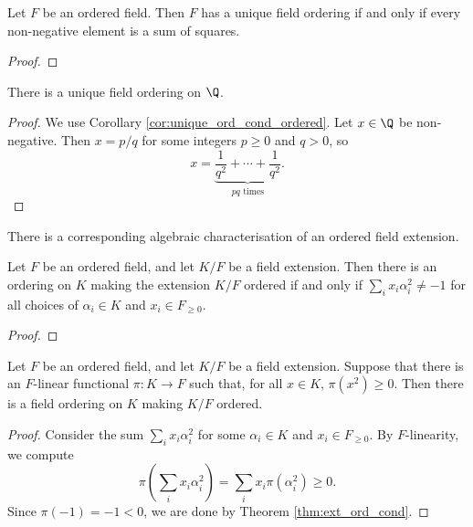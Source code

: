 \begin{corollary}
  \label{cor:unique_ord_cond_ordered}
  \leanok
  Let $F$ be an ordered field. Then $F$ has a unique field ordering if and only if every non-negative element is a sum of squares.
\end{corollary}
\begin{proof}
  \leanok
\end{proof}

\begin{corollary}
  \label{cor:unique_ord_Q}
  There is a unique field ordering on $\Q$.
\end{corollary}
\begin{proof}
  We use Corollary \ref{cor:unique_ord_cond_ordered}. Let $x\in\Q$ be non-negative. Then $x=p/q$ for some integers $p\geq0$ and $q>0$, so 
  \[x=\underbrace{\frac{1}{q^2}+\cdots+\frac{1}{q^2}}_{pq\text{ times}}.\]
\end{proof}

There is a corresponding algebraic characterisation of an ordered field extension.

\begin{theorem}
  \label{thm:ext_ord_cond}
  \leanok
  Let $F$ be an ordered field, and let $K/F$ be a field extension. Then there is an ordering on $K$ making the extension $K/F$ ordered if and only if $\sum_i x_i\alpha_i^2\neq-1$ for all choices of $\alpha_i\in K$ and $x_i\in F_{\geq0}$.
\end{theorem}
\begin{proof}
  \leanok
\end{proof}

\begin{lemma}
  \label{lem:ext_ord_functional_suff}
  Let $F$ be an ordered field, and let $K/F$ be a field extension. Suppose that there is an $F$-linear functional $\pi:K\to F$ such that, for all $x\in K$, $\pi(x^2)\geq0$. Then there is a field ordering on $K$ making $K/F$ ordered.
\end{lemma}
\begin{proof}
  Consider the sum $\sum_i x_i\alpha_i^2$ for some $\alpha_i\in K$ and $x_i\in F_{\geq0}$. By $F$-linearity, we compute
  \[\pi\left(\sum_i x_i\alpha_i^2\right)=\sum_i x_i\pi(\alpha_i^2)\geq0.\]
  Since $\pi(-1)=-1<0$, we are done by Theorem \ref{thm:ext_ord_cond}.
\end{proof}

